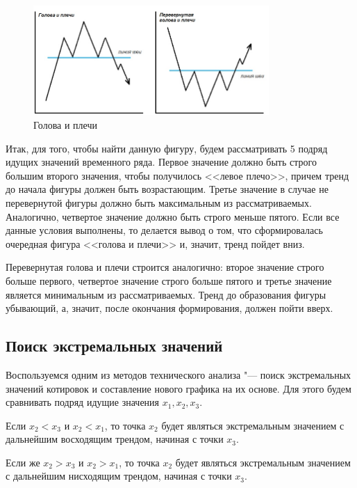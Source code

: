 \documentclass[bachelor, och, coursework]{SCWorks}
\begin{document}
    \begin{figure}[H]
        \centering
        \includegraphics[width=0.8\textwidth]{pic/headshoulders.jpg}
        \caption{Голова и плечи}
    \end{figure}

    Итак, для того, чтобы найти данную фигуру, будем рассматривать 5 подряд
    идущих значений временного ряда. Первое значение должно быть строго большим
    второго значения, чтобы получилось <<левое плечо>>, причем тренд до начала
    фигуры должен быть возрастающим. Третье значение в случае не перевернутой
    фигуры должно быть максимальным из рассматриваемых. Аналогично, четвертое
    значение должно быть строго меньше пятого. Если все данные условия
    выполнены, то делается вывод о том, что сформировалась очередная фигура
    <<голова и плечи>> и, значит, тренд пойдет вниз.

    Перевернутая голова и плечи строится аналогично: второе значение строго
    больше первого, четвертое значение строго больше пятого и третье значение
    является минимальным из рассматриваемых. Тренд до образования фигуры
    убывающий, а, значит, после окончания формирования, должен пойти вверх.

    \subsection{Поиск экстремальных значений}
    Воспользуемся одним из методов технического анализа "--- поиск экстремальных
    значений котировок и составление нового графика на их основе. Для этого
    будем сравнивать подряд идущие значения $x_1, x_2, x_3$.

    Если $x_2 < x_3$ и $x_2 < x_1$, то точка $x_2$ будет являться экстремальным
    значением с дальнейшим восходящим трендом, начиная с точки $x_3$.

    Если же $x_2 > x_3$ и $x_2 > x_1$, то точка $x_2$ будет являться
    экстремальным значением с дальнейшим нисходящим трендом, начиная с точки
    $x_3$.
\end{document}
